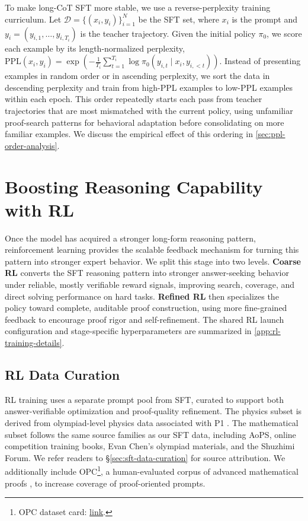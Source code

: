 \documentclass{llmxive}
\begin{document}
To make long-CoT SFT more stable, we use a reverse-perplexity training curriculum. Let
\(\mathcal{D}=\{(x_i,y_i)\}_{i=1}^{N}\) be the SFT set, where \(x_i\) is the
prompt and \(y_i=(y_{i,1},\ldots,y_{i,T_i})\) is the teacher trajectory. Given
the initial policy \(\pi_0\), we score each example by its length-normalized
perplexity, \(\mathrm{PPL}(x_i,y_i)=\exp\left(-\frac{1}{T_i}\sum_{t=1}^{T_i}
\log \pi_0(y_{i,t}\mid x_i,y_{i,<t})\right)\).
Instead of presenting examples in random order or in ascending perplexity, we
sort the data in descending perplexity and train from high-PPL examples to
low-PPL examples within each epoch. This order repeatedly starts each pass from
teacher trajectories that are most mismatched with the current policy, using
unfamiliar proof-search patterns for behavioral adaptation before consolidating
on more familiar examples. We discuss the empirical effect of this ordering in
\cref{sec:ppl-order-analysis}.

\section{Boosting Reasoning Capability with RL}
\label{sec:rl}

Once the model has acquired a stronger long-form reasoning pattern,
reinforcement learning provides the scalable feedback mechanism for turning this
pattern into stronger expert behavior. We split this stage into two levels.
\textbf{Coarse RL} converts the SFT reasoning pattern into stronger
answer-seeking behavior under reliable, mostly verifiable reward signals,
improving search, coverage, and direct solving performance on hard tasks.
\textbf{Refined RL} then specializes the policy toward complete, auditable proof
construction, using more fine-grained feedback to encourage proof rigor and
self-refinement.
The shared
RL launch configuration and stage-specific hyperparameters are summarized in
\cref{app:rl-training-details}.

\subsection{RL Data Curation}

RL training uses a separate prompt pool from SFT, curated to support both
answer-verifiable optimization and proof-quality refinement. The physics subset
is derived from olympiad-level physics data associated with P1
\citep{chen2025p1}. The mathematical subset follows the same source families as
our SFT data, including AoPS, online competition training books, Evan Chen's
olympiad materials, and the Shuzhimi Forum. We refer readers to
\S\ref{sec:sft-data-curation} for source attribution. We additionally include
OPC\footnote{OPC dataset card:
\href{https://huggingface.co/datasets/INSAIT-Institute/OPC}{link}.}, a
human-evaluated corpus of advanced mathematical proofs \citep{dekoninck2025opc},
to increase coverage of proof-oriented prompts.
\end{document}
